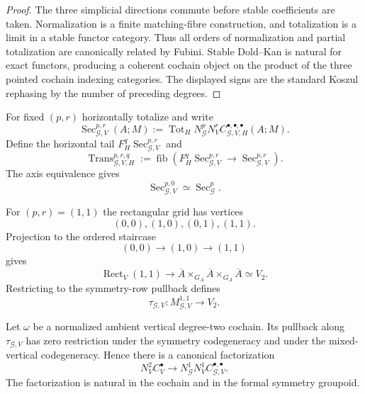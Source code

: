 \begin{proof}
The three simplicial directions commute before stable coefficients are taken.
Normalization is a finite matching-fibre construction, and totalization is a
limit in a stable functor category.  Thus all orders of normalization and partial
totalization are canonically related by Fubini.  Stable Dold--Kan is natural for
exact functors, producing a coherent cochain object on the product of the three
pointed cochain indexing categories.  The displayed signs are the standard Koszul
rephasing by the number of preceding degrees.
\end{proof}

For fixed $(p,r)$ horizontally totalize and write
\[
\operatorname{Sec}_{\mathcal G,V}^{p,r}(A;M)
:=
\operatorname{Tot}_H
N_{\mathcal G}^pN_V^r
C_{\mathcal G,V,H}^{\bullet,\bullet,\bullet}(A;M).
\]
Define the horizontal tail
$F_H^q\operatorname{Sec}_{\mathcal G,V}^{p,r}$ and
\[
\operatorname{Trans}_{\mathcal G,V,H}^{p,r,q}
:=
\operatorname{fib}
\left(
F_H^q\operatorname{Sec}_{\mathcal G,V}^{p,r}
\longrightarrow
\operatorname{Sec}_{\mathcal G,V}^{p,r}
\right).
\]
The axis equivalence gives
\[
\operatorname{Sec}_{\mathcal G,V}^{p,0}
\simeq
\operatorname{Sec}_{\mathcal G}^{p}.
\]

\begin{construction}
\label{constr:symmetry-noether-ordered-staircase}
For $(p,r)=(1,1)$ the rectangular grid has vertices
\[
(0,0),(1,0),(0,1),(1,1).
\]
Projection to the ordered staircase
\[
(0,0)\longrightarrow(1,0)\longrightarrow(1,1)
\]
gives
\[
\operatorname{Rect}_V(1,1)
\longrightarrow
\overline A\times_{G_A}\overline A\times_{G_A}\overline A
\simeq V_2.
\]
Restricting to the symmetry-row pullback defines
\[
\boxed{
\tau_{\mathcal G,V}:
M_{\mathcal G,V}^{1,1}
\longrightarrow
V_2.
}
\]
\end{construction}

\begin{lemma}
\label{lem:symmetry-noether-normalization-of-the-ordered-contraction}
Let $\omega$ be a normalized ambient vertical degree-two cochain.  Its pullback
along $\tau_{\mathcal G,V}$ has zero restriction under the symmetry codegeneracy
and under the mixed-vertical codegeneracy.  Hence there is a canonical
factorization
\[
N_V^2C_V^\bullet
\longrightarrow
N_{\mathcal G}^1N_V^1
C_{\mathcal G,V}^{\bullet,\bullet}.
\]
The factorization is natural in the cochain and in the formal symmetry groupoid.
\end{lemma}

